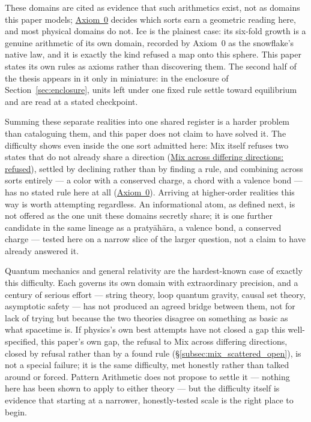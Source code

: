 \documentclass[12pt, a4paper]{article}
\begin{document}
These domains are cited as evidence that such arithmetics exist, not
as domains this paper models;
\hyperref[subsec:axiom0_admissibility]{Axiom~0} decides which sorts
earn a geometric reading here, and most physical domains do not.
Ice is the plainest case: its six-fold growth is a genuine arithmetic
of its own domain, recorded by Axiom~0 as the snowflake's native law,
and it is exactly the kind refused a map onto this sphere. This
paper states its own rules as axioms rather than discovering them.
The second half of the thesis appears in it only in miniature: in the
enclosure of Section~\ref{sec:enclosure}, units left under one fixed rule settle toward equilibrium and are read at a stated checkpoint.

Summing these separate realities into one shared register is a
harder problem than cataloguing them, and this paper does not claim
to have solved it. The difficulty shows even inside the one sort
admitted here: Mix itself refuses two states that do not already
share a direction
(\hyperref[subsec:mix_scattered_open]{Mix across differing
directions: refused}), settled by declining rather than by finding a
rule, and combining across sorts entirely --- a color with a
conserved charge, a chord with a valence bond --- has no stated rule
here at all (\hyperref[subsec:axiom0_admissibility]{Axiom~0}).
Arriving at higher-order realities this way is worth attempting
regardless. An informational atom, as defined next, is not offered
as the one unit these domains secretly share; it is one further
candidate in the same lineage as a pratyāhāra, a valence bond, a
conserved charge --- tested here on a narrow slice of the larger
question, not a claim to have already answered it.

Quantum mechanics and general relativity are the hardest-known case
of exactly this difficulty. Each governs its own domain with
extraordinary precision, and a century of serious effort --- string
theory, loop quantum gravity, causal set theory, asymptotic safety
--- has not produced an agreed bridge between them, not for lack of
trying but because the two theories disagree on something as basic
as what spacetime is. If physics's own best attempts have not closed
a gap this well-specified, this paper's own gap, the refusal to Mix across differing directions, closed by refusal
rather than by a found rule
(\S\ref{subsec:mix_scattered_open}), is not a special failure; it is
the same difficulty, met honestly rather than talked around or
forced. Pattern Arithmetic does not propose to settle
it --- nothing here has been shown to apply to either theory --- but
the difficulty itself is evidence that starting at a narrower,
honestly-tested scale is the right place to begin.
\end{document}
